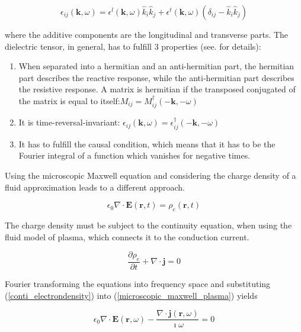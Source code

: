 \documentclass[a4paper,11pt]{thesis}
\begin{document}
\begin{equation}
   \epsilon_{ij}(\mathbf{k},\omega)=\epsilon^l(\mathbf{k},\omega)\hat{k}_i \hat{k}_j+\epsilon^t(\mathbf{k},\omega)(\delta_{ij}-\hat{k}_i \hat{k}_j)
\end{equation}

where the additive components are the longitudinal and transverse parts. The dielectric tensor, in general, has to fulfill 3 properties (see. \cite{melrose1} for details):

\begin{enumerate}
    \item When separated into a hermitian and an anti-hermitian part, the hermitian part describes the reactive response, while the anti-hermitian part describes the resistive response. A matrix is hermitian if the transposed conjugated of the matrix is equal to itself:$M_{ij}=M_{ij}^\dagger (-\mathbf{k},-\omega)$
\item It is time-reversal-invariant: $\epsilon_{ij}(\mathbf{k},\omega)=\epsilon_{ij}^\dagger (-\mathbf{k},-\omega)$
\item It has to fulfill the causal condition, which means that it has to be the Fourier integral of a function which vanishes for negative times.
\end{enumerate}

Using the microscopic Maxwell equation and considering the charge density of a fluid approximation leads to a different approach.

\begin{equation}\label{microscopic_maxwell_plasma}
    \epsilon_0 \nabla \cdot \mathbf{E}(\mathbf{r},t)=\rho_e(\mathbf{r},t)
\end{equation}

The charge density must be subject to the continuity equation, when using the fluid model of plasma, which connects it to the conduction current.

\begin{equation}\label{conti_electrondensity}
    \frac{\partial \rho_e}{\partial t} + \nabla \cdot \mathbf{j}=0
\end{equation}

Fourier transforming the equations into frequency space and substituting (\ref{conti_electrondensity}) into (\ref{microscopic_maxwell_plasma}) yields

\begin{equation}
    \epsilon_0  \nabla \cdot \mathbf{E}(\mathbf{r},\omega)-\frac{\nabla \cdot \mathbf{j}(\mathbf{r},\omega)}{\imath \omega}=0
\end{equation}
\end{document}
